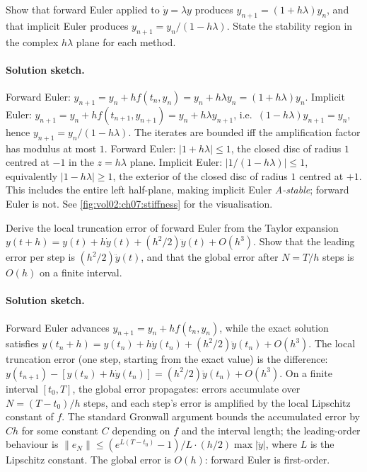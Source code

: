 \begin{exercise}
Show that forward Euler applied to $\dot{y} = \lambda y$ produces
$y_{n+1} = (1 + h\lambda) y_{n}$, and that implicit Euler
produces $y_{n+1} = y_{n}/(1 - h\lambda)$. State the stability
region in the complex $h\lambda$ plane for each method.

\paragraph{Solution sketch.} Forward Euler: $y_{n+1} = y_{n} + h
f(t_{n}, y_{n}) = y_{n} + h \lambda y_{n} = (1 + h \lambda) y_{n}$.
Implicit Euler: $y_{n+1} = y_{n} + h f(t_{n+1}, y_{n+1}) = y_{n}
+ h \lambda y_{n+1}$, i.e.\ $(1 - h \lambda) y_{n+1} = y_{n}$,
hence $y_{n+1} = y_{n}/(1 - h \lambda)$. The iterates are
bounded iff the amplification factor has modulus at most $1$.
Forward Euler: $|1 + h \lambda| \leq 1$, the closed disc of
radius $1$ centred at $-1$ in the $z = h \lambda$ plane. Implicit
Euler: $|1/(1 - h \lambda)| \leq 1$, equivalently $|1 - h
\lambda| \geq 1$, the exterior of the closed disc of radius $1$
centred at $+1$. This includes the entire left half-plane,
making implicit Euler \emph{A-stable}; forward Euler is not. See
\cref{fig:vol02:ch07:stiffness} for the visualisation.
\end{exercise}

\begin{exercise}
Derive the local truncation error of forward Euler from the
Taylor expansion $y(t + h) = y(t) + h\dot{y}(t) +
(h^{2}/2)\ddot{y}(t) + O(h^{3})$. Show that the leading error per
step is $(h^{2}/2)\ddot{y}(t)$, and that the global error after
$N = T/h$ steps is $O(h)$ on a finite interval.

\paragraph{Solution sketch.} Forward Euler advances $y_{n+1} =
y_{n} + h f(t_{n}, y_{n})$, while the exact solution satisfies
$y(t_{n} + h) = y(t_{n}) + h \dot{y}(t_{n}) + (h^{2}/2)\ddot{y}
(t_{n}) + O(h^{3})$. The local truncation error (one step,
starting from the exact value) is the difference: $y(t_{n+1}) -
[y(t_{n}) + h \dot{y}(t_{n})] = (h^{2}/2) \ddot{y}(t_{n}) +
O(h^{3})$. On a finite interval $[t_{0}, T]$, the global error
propagates: errors accumulate over $N = (T - t_{0})/h$ steps, and
each step's error is amplified by the local Lipschitz constant of
$f$. The standard Gronwall argument bounds the accumulated error
by $C h$ for some constant $C$ depending on $f$ and the interval
length; the leading-order behaviour is $\|e_{N}\| \leq (e^{L
(T - t_{0})} - 1) / L \cdot (h/2) \max |\ddot{y}|$, where $L$ is
the Lipschitz constant. The global error is $O(h)$: forward Euler
is first-order.
\end{exercise}

